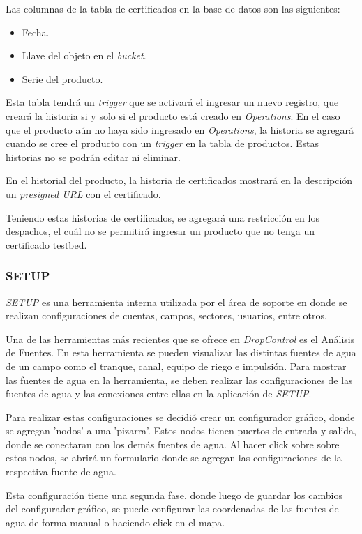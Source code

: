Las columnas de la tabla de certificados en la base de datos son las siguientes: 
\begin{itemize}
    \item Fecha.
    \item Llave del objeto en el \textit{bucket}.
    \item Serie del producto.
\end{itemize}
Esta tabla tendrá un \textit{trigger} que se activará el ingresar un nuevo registro, que creará la historia si y solo si el producto está creado en \textit{Operations}.
En el caso que el producto aún no haya sido ingresado en \textit{Operations}, la historia se agregará cuando se cree el producto con un \textit{trigger} en la tabla de productos.
Estas historias no se podrán editar ni eliminar.

En el historial del producto, la historia de certificados mostrará en la descripción un \textit{presigned URL} con el certificado.

Teniendo estas historias de certificados, se agregará una restricción en los despachos, el cuál no se permitirá ingresar un producto que no tenga un certificado testbed.
\fi

\subsubsection{SETUP}

\textit{SETUP} es una herramienta interna utilizada por el área de soporte en donde se realizan configuraciones de cuentas, campos, sectores, usuarios, entre otros.


Una de las herramientas más recientes que se ofrece en \textit{DropControl} es el Análisis de Fuentes. En esta herramienta se pueden visualizar las distintas fuentes de agua de un campo como el tranque, canal, equipo de riego e impulsión.
Para mostrar las fuentes de agua en la herramienta, se deben realizar las configuraciones de las fuentes de agua y las conexiones entre ellas en la aplicación de \textit{SETUP}.

Para realizar estas configuraciones se decidió crear un configurador gráfico, donde se agregan 'nodos' a una 'pizarra'. Estos nodos tienen puertos de entrada y salida, donde se conectaran con los demás fuentes de agua. Al hacer click sobre sobre estos nodos, se abrirá un formulario donde se agregan las configuraciones de la respectiva fuente de agua.

Esta configuración tiene una segunda fase, donde luego de guardar los cambios del configurador gráfico, se puede configurar las coordenadas de las fuentes de agua de forma manual o haciendo click en el mapa.

